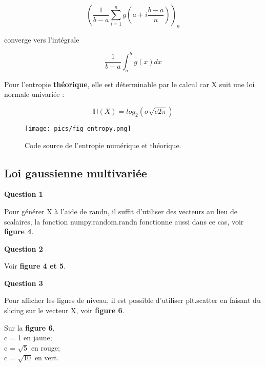 \documentclass{article}
\begin{document}
$$ (\frac{1}{b-a} \sum_{i=1}^{n} g(a + i\frac{b-a}{n}) )_n $$

converge vers l'intégrale 

$$ \frac{1}{b-a} \int_{a}^{b} g(x)dx $$

\vspace{2\baselineskip}

Pour l'entropie \textbf{théorique}, elle est déterminable par le calcul car X suit une loi normale univariée :

$$ \mathbb{H}(X) = log_2(\sigma\sqrt{e2\pi}) $$


\vspace{2\baselineskip}

\begin{figure}[h]
	\centering
	\texttt{[image: pics/fig\_entropy.png]}
	\caption{Code source de l'entropie numérique et théorique.}
\end{figure}

\vspace{2\baselineskip}

\newpage
	\subsection{Loi gaussienne multivariée}
		\textbf{Question 1}

\vspace{2\baselineskip}

Pour générer X à l'aide de randn, il suffit d'utiliser des vecteurs au lieu de scalaires,
la fonction numpy.random.randn fonctionne aussi dans ce cas, voir \textbf{figure 4}.
	
\vspace{2\baselineskip}

		\textbf{Question 2}

\vspace{2\baselineskip}

Voir \textbf{figure 4 et 5}.

\vspace{2\baselineskip}

		\textbf{Question 3}

\vspace{2\baselineskip}

Pour afficher les lignes de niveau, il est possible d'utiliser plt.scatter en faisant du slicing sur
le vecteur X, voir \textbf{figure 6}.

\vspace{2\baselineskip}

Sur la \textbf{figure 6}, \\c = 1 en jaune; \\ c = $\sqrt{5}$ en rouge; \\ c = $\sqrt{10}$ en vert.
\end{document}

